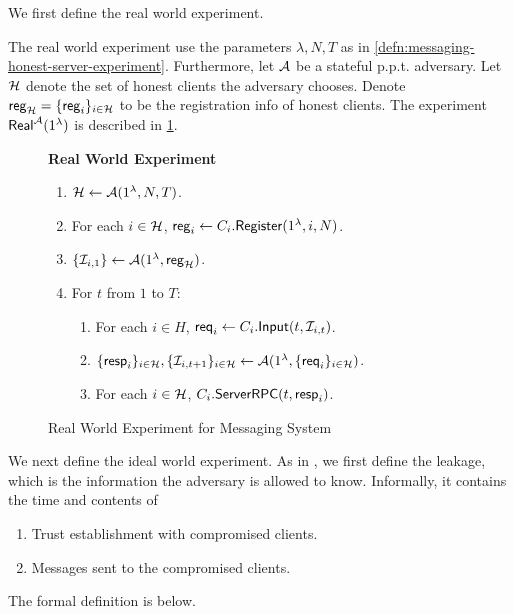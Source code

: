 We first define the real world experiment.

\begin{definition}
\label{defn:messaging-real-world-experiment}
The real world experiment use the parameters $\lambda, N, T$ as in \cref{defn:messaging-honest-server-experiment}. Furthermore, let $\mathcal{A}$ be a stateful p.p.t. adversary. Let $\mathcal{H}$ denote the set of honest clients the adversary chooses. Denote $\mathsf{reg}_{\mathcal{H}} = \{\mathsf{reg}_i\}_{i \in\mathcal{H}}$ to be the registration info of honest clients. The experiment $\mathsf{Real}^{\mathcal{A}}(1^{\lambda})$ is described in \cref{expr:messaging-real-world}.
\end{definition}

\begin{figure}[!ht]
\begin{framed}
\textbf{Real World Experiment}
\begin{enumerate}
\item $\mathcal{H} \leftarrow \mathcal{A}(1^{\lambda}, N, T)$.
\item For each $i \in \mathcal{H}$, $\mathsf{reg}_i \leftarrow C_i.\mathsf{Register}(1^{\lambda}, i, N)$. 
\item $\{\mathcal{I}_{i, 1}\} \leftarrow \mathcal{A}(1^{\lambda}, \mathsf{reg}_{\mathcal{H}})$.
\item For $t$ from $1$ to $T$:
    \begin{enumerate}
    \item For each $i \in H$, $\mathsf{req}_i \leftarrow C_i.\mathsf{Input}(t, \mathcal{I}_{i, t})$.
    
    \item $\{\mathsf{resp}_i\}_{i \in \mathcal{H}}, \{\mathcal{I}_{i, t + 1}\}_{i \in \mathcal{H}} \leftarrow \mathcal{A}(1^{\lambda}, \{\mathsf{req}_i\}_{i \in \mathcal{H}})$.
    
    \item For each $i \in \mathcal{H}$, $C_i.\mathsf{ServerRPC}(t, \mathsf{resp}_i)$.
    \end{enumerate}
\end{enumerate}
\end{framed}
\caption{Real World Experiment for Messaging System}
\label{expr:messaging-real-world}
\end{figure}

We next define the ideal world experiment. As in \cite{shi2021non}, we first define the leakage, which is the information the adversary is allowed to know. Informally, it contains the time and contents of
\begin{enumerate}
    \item Trust establishment with compromised clients.
    \item Messages sent to the compromised clients.
\end{enumerate}
The formal definition is below.

